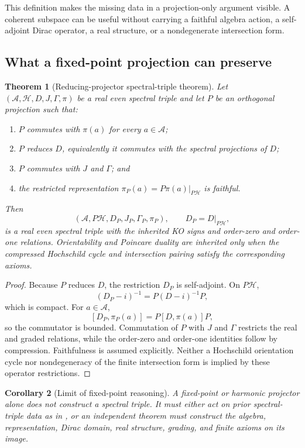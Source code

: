 \documentclass[11pt,a4paper,twoside]{article}
\theoremstyle{plain}
\newtheorem{theorem}{Theorem}[section]
\newtheorem{corollary}[theorem]{Corollary}
\theoremstyle{definition}
\theoremstyle{remark}
\begin{document}
This definition makes the missing data in a projection-only argument
visible.  A coherent subspace can be useful without carrying a faithful
algebra action, a self-adjoint Dirac operator, a real structure, or a
nondegenerate intersection form.

\subsection{What a fixed-point projection can preserve}

\begin{theorem}[Reducing-projector spectral-triple theorem]
\label{thm:compression}
Let $(\mathcal{A},\mathcal{H},D,J,\Gamma,\pi)$ be a real even spectral
triple and let $P$ be an orthogonal projection such that:
\begin{enumerate}
\item $P$ commutes with $\pi(a)$ for every $a\in\mathcal{A}$;
\item $P$ reduces $D$, equivalently it commutes with the spectral
      projections of $D$;
\item $P$ commutes with $J$ and $\Gamma$; and
\item the restricted representation
      $\pi_P(a)=P\pi(a)|_{P\mathcal{H}}$ is faithful.
\end{enumerate}
Then
\[
 (\mathcal{A},P\mathcal{H},D_P,J_P,\Gamma_P,\pi_P),
 \qquad D_P=D|_{P\mathcal{H}},
\]
is a real even spectral triple with the inherited KO signs and order-zero and
order-one relations.  Orientability and Poincare duality are inherited only
when the compressed Hochschild cycle and intersection pairing satisfy the
corresponding axioms.
\end{theorem}

\begin{proof}
Because $P$ reduces $D$, the restriction $D_P$ is self-adjoint.  On
$P\mathcal{H}$,
\[
 (D_P-i)^{-1}=P(D-i)^{-1}P,
\]
which is compact.  For $a\in\mathcal{A}$,
\[
 [D_P,\pi_P(a)]=P[D,\pi(a)]P,
\]
so the commutator is bounded.  Commutation of $P$ with $J$ and $\Gamma$
restricts the real and graded relations, while the order-zero and order-one
identities follow by compression.  Faithfulness is assumed explicitly.
Neither a Hochschild orientation cycle nor nondegeneracy of the finite
intersection form is implied by these operator restrictions.
\end{proof}

\begin{corollary}[Limit of fixed-point reasoning]
\label{cor:projection-limit}
A fixed-point or harmonic projector alone does not construct a spectral
triple.  It must either act on prior spectral-triple data as in
, or an independent theorem must construct the algebra,
representation, Dirac domain, real structure, grading, and finite axioms on
its image.
\end{corollary}
\end{document}
